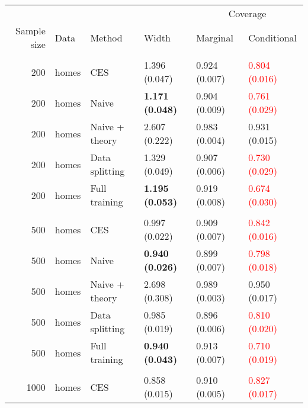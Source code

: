 
\begin{tabular}[t]{rlllll}
\toprule
\multicolumn{4}{c}{ } & \multicolumn{2}{c}{Coverage} \\
\cmidrule(l{3pt}r{3pt}){5-6}
Sample size & Data & Method & Width & Marginal & Conditional\\
\midrule
\addlinespace[0.3em]
\multicolumn{6}{l}{\textbf{200}}\\
\hspace{1em}200 & homes & CES & 1.396 (0.047) & 0.924 (0.007) & \textcolor{red}{0.804 (0.016)}\\
\hspace{1em}200 & homes & Naive & \textbf{1.171 (0.048)} & 0.904 (0.009) & \textcolor{red}{0.761 (0.029)}\\
\hspace{1em}200 & homes & Naive + theory & 2.607 (0.222) & 0.983 (0.004) & 0.931 (0.015)\\
\hspace{1em}200 & homes & Data splitting & 1.329 (0.049) & 0.907 (0.006) & \textcolor{red}{0.730 (0.029)}\\
\hspace{1em}200 & homes & Full training & \textbf{1.195 (0.053)} & 0.919 (0.008) & \textcolor{red}{0.674 (0.030)}\\
\addlinespace[0.3em]
\multicolumn{6}{l}{\textbf{500}}\\
\hspace{1em}500 & homes & CES & 0.997 (0.022) & 0.909 (0.007) & \textcolor{red}{0.842 (0.016)}\\
\hspace{1em}500 & homes & Naive & \textbf{0.940 (0.026)} & 0.899 (0.007) & \textcolor{red}{0.798 (0.018)}\\
\hspace{1em}500 & homes & Naive + theory & 2.698 (0.308) & 0.989 (0.003) & 0.950 (0.017)\\
\hspace{1em}500 & homes & Data splitting & 0.985 (0.019) & 0.896 (0.006) & \textcolor{red}{0.810 (0.020)}\\
\hspace{1em}500 & homes & Full training & \textbf{0.940 (0.043)} & 0.913 (0.007) & \textcolor{red}{0.710 (0.019)}\\
\addlinespace[0.3em]
\multicolumn{6}{l}{\textbf{1000}}\\
\hspace{1em}1000 & homes & CES & 0.858 (0.015) & 0.910 (0.005) & \textcolor{red}{0.827 (0.017)}\\

\end{tabular}
